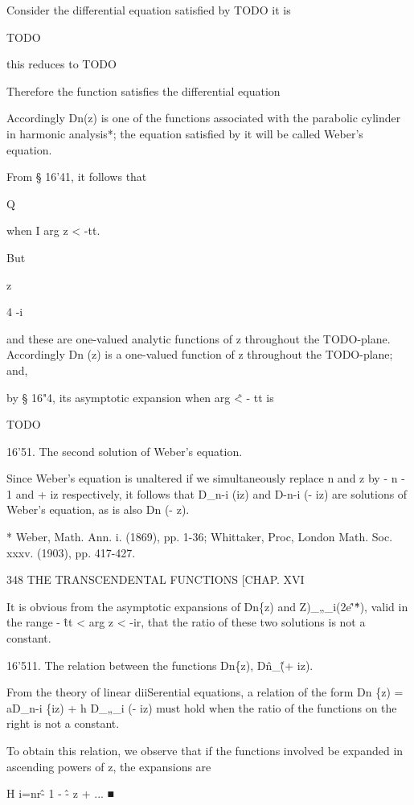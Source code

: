 
Consider the differential equation satisfied by TODO it is

TODO

this reduces to TODO

Therefore the function satisfies the differential equation

Accordingly Dn(z) is one of the functions associated with the
parabolic cylinder in harmonic analysis*; the equation satisfied by it
will be called Weber's equation.

From § 16'41, it follows that

Q

when I arg z < -tt.

But

z

4 -i

and these are one-valued analytic functions of z throughout the
TODO-plane. Accordingly Dn (z) is a one-valued function of z
throughout the TODO-plane; and,

by § 16"4, its asymptotic expansion when arg \^ < - tt is

TODO

16'51. The second solution of Weber's equation.

Since Weber's equation is unaltered if we simultaneously replace n and
z by - n - 1 and + iz respectively, it follows that D\_n-i (iz) and
D-n-i (- iz) are solutions of Weber's equation, as is also Dn (- z).

* Weber, Math. Ann. i. (1869), pp. 1-36; Whittaker, Proc, London Math.
Soc. xxxv. (1903), pp. 417-427.

348 THE TRANSCENDENTAL FUNCTIONS [CHAP. XVI

It is obvious from the asymptotic expansions of Dn\{z) and
Z)\_„\_i(2e\^'\^*), valid in the range - \^ tt < arg z < -ir, that the
ratio of these two solutions is not a constant.

16'511. The relation between the functions Dn\{z), D\^n\_\^ (+ iz).

From the theory of linear diiSerential equations, a relation of the
form Dn \{z) = aD\_n-i \{iz) + h D\_„\_i (- iz) must hold when the
ratio of the functions on the right is not a constant.

To obtain this relation, we observe that if the functions involved be
expanded in ascending powers of z, the expansions are

H i=nr\^ - 1 - \^ - z + ... ■

